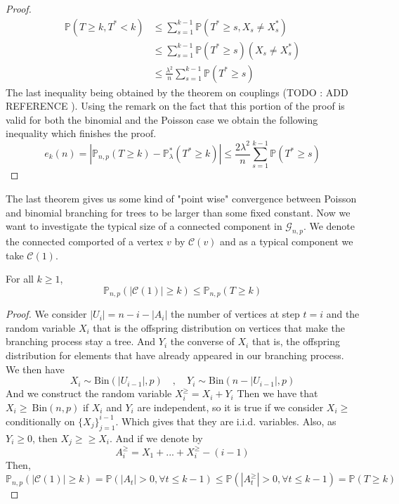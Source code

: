\begin{proof}
	\begin{align}
		\mathbb{P}(T\geq k, T^* < k) &\leq \sum_{s=1}^{k-1} \mathbb{P}(T^* \geq s, X_s \neq X_s^*) 	\\
					     &\leq  \sum_{s=1}^{k-1} \mathbb{P}(T^* \geq s)(X_s \neq X_s^*) 	\\
					     &\leq  \frac{\lambda ^2}{n} \sum_{s=1}^{k-1} \mathbb{P}(T^* \geq s) 
	\end{align}
	The last inequality being obtained by the theorem on couplings (TODO : ADD REFERENCE ).
	Using the remark on the fact that this portion of the proof is valid for both the binomial and the Poisson case we obtain the following inequality which finishes the proof.
	\begin{equation}
		e_k(n) = |\mathbb{P}_{n, p}(T \geq k) -\mathbb{P}_{\lambda}^*(T^* \geq k)| \leq \frac{2\lambda ^2}{n}\sum_{s=1}^{k-1} \mathbb{P}(T^* \geq s)
	\end{equation}
\end{proof}
The last theorem gives us some kind of "point wise" convergence between Poisson and binomial branching for trees to be larger than some fixed constant.
\newline
Now we want to investigate the typical size of a connected component in $\mathcal{G}_{n,p}$. We denote the connected comported of a vertex $v$ by $\mathcal{C}(v)$ and as a typical component we take $\mathcal{C}(1)$.
\begin{theorem}
	For all $k\geq1$,
	\begin{equation}
		\mathbb{P}_{n,p}(|\mathcal{C}(1)| \geq k) \leq \mathbb{P}_{n,p}(T\geq k)
	\end{equation}
\end{theorem}
\begin{proof}
	We consider $|U_i| = n - i - |A_i|$ the number of vertices at step $t = i$ and the random variable $X_i$ that is the offspring distribution on vertices that make the branching process stay a tree.
	And $Y_i$ the converse of $X_i$ that is, the offspring distribution for elements that have already appeared in our branching process. We then have
	\begin{equation}
		X_i \sim \text{Bin}(|U_{i-1}|, p) \quad, \quad Y_i \sim \text{Bin}(n-|U_{i-1}|, p)
	\end{equation}
	And we construct the random variable $X_i^{\geq} = X_i + Y_i$ Then we have that $X_i{\geq} ~ \text{Bin}(n, p)$ if $X_i$ and $Y_i$ are independent, so it is true if we consider $X_i{\geq}$ conditionally on $\{X_j\}_{j=1}^{i-1}$. Which gives that they are i.i.d. variables.
	\newline
	Also, as $Y_i \geq 0$, then $X_j{\geq} \geq X_i$.
	And if we denote by 
	\begin{equation}
		A_i^{\geq} = X_1 + ... + X_i^{\geq} - (i-1)
	\end{equation}
	Then, 
	\begin{equation}
		\mathbb{P}_{n,p}(|\mathcal{C}(1)|\geq k) = \mathbb{P}(|A_t| > 0, \forall t \leq k-1) 
		\leq \mathbb{P}(|A_t^{\geq}| > 0, \forall t \leq k-1) = \mathbb{P}(T\geq k)
	\end{equation}
\end{proof}
